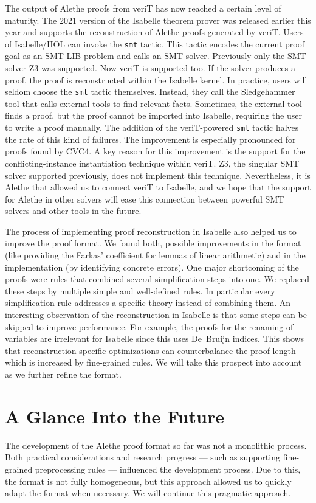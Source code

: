 \documentclass[submission,copyright,creativecommons]{eptcs}
\begin{document}
The output of Alethe proofs from veriT  has now reached a certain level of maturity.
The 2021 version of the Isabelle theorem prover was released earlier this year
and supports the reconstruction of
Alethe proofs generated by veriT.  Users of Isabelle/HOL can invoke the \texttt{smt}
tactic. This tactic encodes the current proof goal as an SMT-LIB problem and
calls an SMT solver. Previously only the SMT solver Z3 was supported. Now
veriT is supported too. If the solver produces a proof, the proof is
reconstructed within the Isabelle kernel. In practice, users will seldom
choose the \texttt{smt} tactic themselves. Instead, they call the
Sledgehammer tool that calls external tools to find relevant facts. Sometimes,
the external tool finds a proof, but the proof cannot be imported into Isabelle,
requiring the user to write a proof manually.
The addition of the veriT-powered \texttt{smt} tactic halves~\cite{schurr-2021} the rate
of this kind of failures. The improvement is especially pronounced for proofs found by CVC4.
A key reason for this improvement is the support for the
conflicting-instance instantiation technique within veriT.  Z3, the
singular SMT solver supported previously, does not implement this
technique.  Nevertheless, it is Alethe that allowed us to connect veriT
to Isabelle, and we hope that the support for Alethe in other solvers
will ease this connection between powerful SMT solvers and other tools in the future.

The process of implementing proof reconstruction in Isabelle also
helped us to improve the proof format. We found both,
possible improvements in the format (like providing the Farkas' coefficient for
lemmas of linear arithmetic) and in the implementation (by identifying
concrete errors).
One major shortcoming of the proofs were rules that combined several simplification
steps into one.
We replaced these steps by
multiple simple and well-defined rules. In particular every simplification rule
addresses a specific theory instead of combining them.
An interesting
observation of the reconstruction in Isabelle is that some steps can be skipped
to improve performance.  For example, the proofs for the renaming of variables
are irrelevant for Isabelle since this uses De~Bruijn indices.
%
This shows that reconstruction specific
optimizations can counterbalance the proof length which is increased by fine-grained
rules.
%
We will take this prospect into account as we further refine the format.

\section{A Glance Into the Future}
The development of the Alethe proof format so far was not a monolithic
process.  Both practical considerations and research progress --- such as
supporting fine-grained preprocessing rules --- influenced the development process.
Due to this, the format is not fully homogeneous, but this approach allowed
us to quickly adapt the format when necessary. We will continue this
pragmatic approach.
\end{document}
